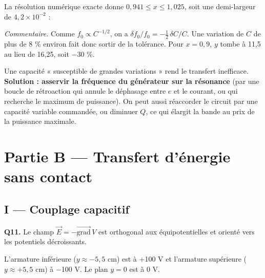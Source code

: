 \documentclass[11pt,a4paper]{article}
\newcommand{\equationajustee}[1]{%
  \sbox{\boiteequation}{$\displaystyle #1$}%
  \ifdim\wd\boiteequation>\linewidth
    \[\resizebox{\linewidth}{!}{\usebox{\boiteequation}}\]%
  \else
    \[#1\]%
  \fi}
\begin{document}
La résolution numérique exacte donne \(0{,}941\leqslant x\leqslant1{,}025\), soit une demi-largeur de \(4{,}2\times10^{-2}\) :

\equationajustee{\boxed{\left|\frac{\delta f}{f_0}\right|\lesssim4\ \%}}

\equationajustee{\boxed{|\delta f|\lesssim8\ \text{kHz}}}

\emph{Commentaire.} Comme \(f_0\propto C^{-1/2}\), on a \(\delta f_0/f_0=-\tfrac12\,\delta C/C\). Une variation de \(C\) de plus de 8 \% environ fait donc sortir de la tolérance. Pour \(x=0{,}9\), \(y\) tombe à 11,5 au lieu de 16,25, soit −30 \%.

Une capacité « susceptible de grandes variations » rend le transfert inefficace. \textbf{Solution : asservir la fréquence du générateur sur la résonance} (par une boucle de rétroaction qui annule le déphasage entre \(e\) et le courant, ou qui recherche le maximum de puissance). On peut aussi réaccorder le circuit par une capacité variable commandée, ou diminuer \(Q\), ce qui élargit la bande au prix de la puissance maximale.

\hypertarget{partie-b-transfert-duxe9nergie-sans-contact}{%
\section{Partie B --- Transfert d'énergie sans contact}\label{partie-b-transfert-duxe9nergie-sans-contact}}

\hypertarget{i-couplage-capacitif}{%
\subsection{I --- Couplage capacitif}\label{i-couplage-capacitif}}

\textbf{Q11.} Le champ \(\vec E=-\overrightarrow{\text{grad}}\,V\) est orthogonal aux équipotentielles et orienté vers les potentiels décroissants.

L'armature inférieure (\(y\approx-5{,}5\) cm) est à +100 V et l'armature supérieure (\(y\approx+5{,}5\) cm) à −100 V. Le plan \(y=0\) est à 0 V.
\end{document}
